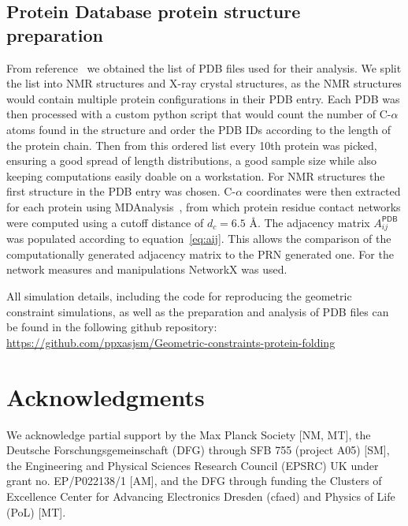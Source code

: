 \documentclass[9pt]{elife}
\begin{document}
\subsection{Protein Database protein structure preparation}
From reference~\cite{Hong2013} we obtained the list of PDB files used for their analysis. We split the list into NMR structures and X-ray crystal structures, as the NMR structures would contain multiple protein configurations in their PDB entry. Each PDB was then processed with a custom python script that would count the number of C-$\alpha$ atoms found in the structure and order the PDB IDs according to the length of the protein chain. Then from this ordered list every 10th protein was picked, ensuring a good spread of length distributions, a good sample size while also keeping computations easily doable on a workstation. For NMR structures the first structure in the PDB entry was chosen. C-$\alpha$ coordinates were then extracted for each protein using MDAnalysis~\cite{doi:10.1002/jcc.21787,oliver_beckstein-proc-scipy-2016}, from which protein residue contact networks were computed using a cutoff distance of $d_c=6.5$ \AA. The adjacency matrix $A^{\textsf{PDB}}_{ij}$ was populated according to equation~\ref{eq:aij}. This allows the comparison of the computationally generated adjacency matrix to the PRN generated one. For the network measures and manipulations NetworkX \cite{SciPyProceedings_11} was used.

All simulation details, including the code for reproducing the geometric constraint simulations, as well as the preparation and analysis of PDB files can be found in the following github repository: \url{https://github.com/ppxasjsm/Geometric-constraints-protein-folding}
 
\section{Acknowledgments}
We acknowledge partial support by the Max Planck Society [NM, MT], the Deutsche Forschungsgemeinschaft (DFG) through SFB 755 (project A05) [SM], the Engineering and Physical Sciences Research Council (EPSRC) UK under grant no. EP/P022138/1 [AM], and the DFG through funding the Clusters of Excellence Center for Advancing Electronics Dresden (cfaed) and Physics of Life (PoL) [MT].


\end{document}
